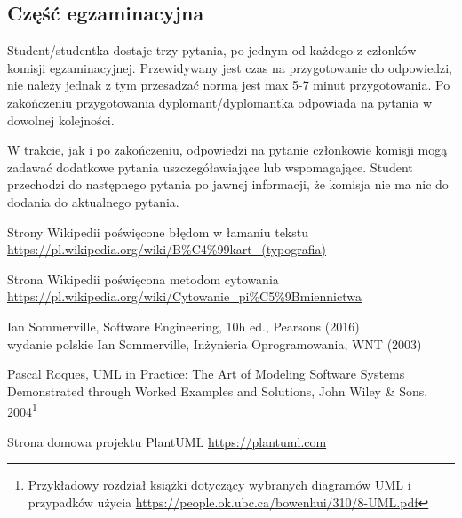 \documentclass[12pt,a4paper]{article}
\begin{document}
\subsection{Część egzaminacyjna}

Student/studentka dostaje trzy pytania, po jednym od każdego z członków komisji egzaminacyjnej. Przewidywany jest czas na przygotowanie do odpowiedzi, nie należy jednak z tym przesadzać normą jest max 5-7 minut przygotowania. Po zakończeniu przygotowania dyplomant/dyplomantka odpowiada na pytania w dowolnej kolejności.

W trakcie, jak i po zakończeniu, odpowiedzi na pytanie członkowie komisji mogą zadawać dodatkowe pytania uszczegóławiające lub wspomagające. Student przechodzi do następnego pytania po jawnej informacji, że komisja nie ma nic do dodania do aktualnego pytania.









 Strony Wikipedii poświęcone błędom w łamaniu tekstu\\
\url{https://pl.wikipedia.org/wiki/B%C4%99kart_(typografia)}

 Strona Wikipedii poświęcona metodom cytowania \\
\url{https://pl.wikipedia.org/wiki/Cytowanie_pi%C5%9Bmiennictwa}

 Ian Sommerville, Software Engineering, 10h ed., Pearsons  (2016)\\
 wydanie polskie Ian Sommerville, Inżynieria Oprogramowania, WNT (2003)

 Pascal Roques, UML in Practice: The Art of Modeling Software Systems Demonstrated through Worked Examples and Solutions, John Wiley \& Sons, 2004\footnote{
    Przykładowy rozdział książki dotyczący wybranych diagramów UML i przypadków użycia \url{https://people.ok.ubc.ca/bowenhui/310/8-UML.pdf}}

 Strona domowa projektu PlantUML \url{https://plantuml.com}
\end{document}
